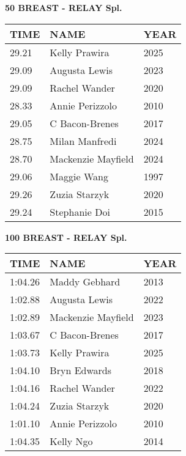 \begin{table}[H]
\centering
\begin{minipage}[t]{0.6\textwidth}
\centering
\textbf{50 BREAST - RELAY Spl.}\\[0.1cm]
\begin{tabular}{@{}p{1.8cm}p{2.8cm}p{1.2cm}@{}}
\hline
    \textbf{TIME} & \textbf{NAME} & \textbf{YEAR} \\
\hline
    29.21 & Kelly Prawira & 2025 \\
    29.09 & Augusta Lewis & 2023 \\
    29.09 & Rachel Wander & 2020 \\
    28.33 & Annie Perizzolo & 2010 \\
    29.05 & C Bacon-Brenes & 2017 \\
    28.75 & Milan Manfredi & 2024 \\
    28.70 & Mackenzie Mayfield & 2024 \\
    29.06 & Maggie Wang & 1997 \\
    29.26 & Zuzia Starzyk & 2020 \\
    29.24 & Stephanie Doi & 2015 \\
\hline
\end{tabular}
\end{minipage}
\end{table}

\begin{table}[H]
\centering
\begin{minipage}[t]{0.6\textwidth}
\centering
\textbf{100 BREAST - RELAY Spl.}\\[0.1cm]
\begin{tabular}{@{}p{1.8cm}p{2.8cm}p{1.2cm}@{}}
\hline
    \textbf{TIME} & \textbf{NAME} & \textbf{YEAR} \\
\hline
    1:04.26 & Maddy Gebhard & 2013 \\
    1:02.88 & Augusta Lewis & 2022 \\
    1:02.89 & Mackenzie Mayfield & 2023 \\
    1:03.67 & C Bacon-Brenes & 2017 \\
    1:03.73 & Kelly Prawira & 2025 \\
    1:04.10 & Bryn Edwards & 2018 \\
    1:04.16 & Rachel Wander & 2022 \\
    1:04.24 & Zuzia Starzyk & 2020 \\
    1:01.10 & Annie Perizzolo & 2010 \\
    1:04.35 & Kelly Ngo & 2014 \\
\hline
\end{tabular}
\end{minipage}
\end{table}

